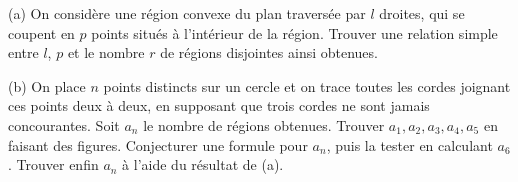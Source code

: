 (a) On considère une région convexe du plan traversée par $l$ droites, qui se coupent en $p$ points situés à l'intérieur de la région. Trouver une relation simple entre $l$, $p$ et le nombre $r$ de régions disjointes ainsi obtenues.

(b) On place $n$ points distincts sur un cercle et on trace toutes les cordes joignant ces points deux à deux, en supposant que trois cordes ne sont jamais concourantes. Soit $a_n$ le nombre de régions obtenues. Trouver $a_1, a_2, a_3, a_4, a_5$ en faisant des figures. Conjecturer une formule pour $a_n$, puis la tester en calculant $a_6$. Trouver enfin $a_n$ à l'aide du résultat de (a).
